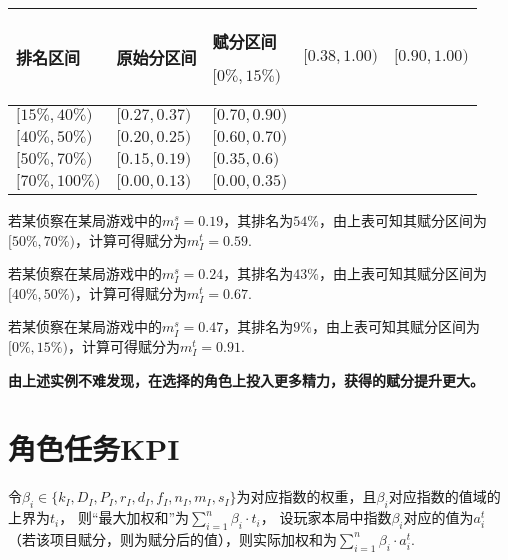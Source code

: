 \documentclass{ctexart}
\begin{document}
\begin{longtable}{|>{\centering\arraybackslash}p{6em}|>{\centering\arraybackslash}p{6em}|>{\centering\arraybackslash}p{6em}|}
    \hline

    排名区间             & 原始分区间  & 赋分区间     \endhead

    \hline

    $[0\%, 15\%)$ & $[0.38, 1.00)$  & $[0.90, 1.00)$          \\

    \hline

    $[15\%, 40\%)$  & $[0.27, 0.37)$ & $[0.70, 0.90)$          \\

    \hline

    $[40\%, 50\%)$   & $[0.20, 0.25)$ & $[0.60, 0.70)$          \\

    \hline

    $[50\%, 70\%)$    & $[0.15, 0.19)$ & $[0.35, 0.6)$          \\

    \hline

    $[70\%, 100\%)$    & $[0.00, 0.13)$ & $[0.00, 0.35)$          \\

    \hline

\end{longtable}

若某侦察在某局游戏中的$m_I^s = 0.19$，其排名为$54\%$，由上表可知其赋分区间为$[50\%, 70\%)$，计算可得赋分为$m_I^t = 0.59$.

若某侦察在某局游戏中的$m_I^s = 0.24$，其排名为$43\%$，由上表可知其赋分区间为$[40\%, 50\%)$，计算可得赋分为$m_I^t = 0.67$.

若某侦察在某局游戏中的$m_I^s = 0.47$，其排名为$9\%$，由上表可知其赋分区间为$[0\%, 15\%)$，计算可得赋分为$m_I^t = 0.91$.



\textbf{由上述实例不难发现，在选择的角色上投入更多精力，获得的赋分提升更大。}

\section{角色任务KPI}
\label{sec:rKPI}

令$\beta_i \in \{k_I, D_I, P_I, r_I, d_I, f_I, n_I, m_I, s_I\}$为对应指数的权重，且$\beta_i$对应指数的值域的上界为$t_i$，
则“最大加权和”为$\sum_{i = 1}^{n} \beta_i \cdot t_i$，
设玩家本局中指数$\beta_i$对应的值为$a_i^t$（若该项目赋分，则为赋分后的值），则实际加权和为$\sum_{i = 1}^{n} \beta_i \cdot a_i^t$.
\end{document}
